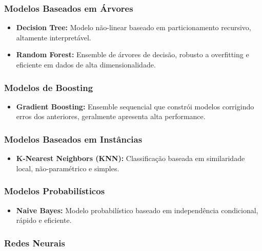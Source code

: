 \documentclass[12pt,a4paper]{article}
\begin{document}
\subsubsection{Modelos Baseados em Árvores}

\begin{itemize}
    \item \textbf{Decision Tree:} Modelo não-linear baseado em particionamento recursivo, altamente interpretável.
    \item \textbf{Random Forest:} Ensemble de árvores de decisão, robusto a overfitting e eficiente em dados de alta dimensionalidade.
\end{itemize}

\subsubsection{Modelos de Boosting}

\begin{itemize}
    \item \textbf{Gradient Boosting:} Ensemble sequencial que constrói modelos corrigindo erros dos anteriores, geralmente apresenta alta performance.
\end{itemize}

\subsubsection{Modelos Baseados em Instâncias}

\begin{itemize}
    \item \textbf{K-Nearest Neighbors (KNN):} Classificação baseada em similaridade local, não-paramétrico e simples.
\end{itemize}

\subsubsection{Modelos Probabilísticos}

\begin{itemize}
    \item \textbf{Naive Bayes:} Modelo probabilístico baseado em independência condicional, rápido e eficiente.
\end{itemize}

\subsubsection{Redes Neurais}
\end{document}
